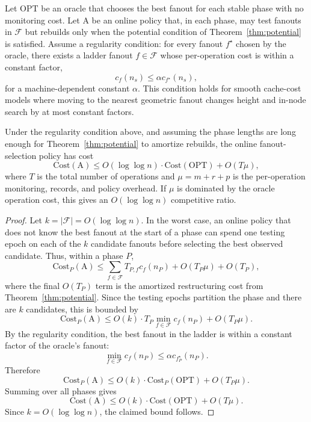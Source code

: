 Let $\mathrm{OPT}$ be an oracle that chooses the best fanout for each stable
phase with no monitoring cost.  Let $\mathrm{A}$ be an online policy that, in
each phase, may test fanouts in $\mathcal{F}$ but rebuilds only when the
potential condition of Theorem~\ref{thm:potential} is satisfied.  Assume a
regularity condition: for every fanout $f^\star$ chosen by the oracle, there
exists a ladder fanout $f\in\mathcal{F}$ whose per-operation cost is within a
constant factor,
\[
  c_f(n_s) \le \alpha c_{f^\star}(n_s),
\]
for a machine-dependent constant $\alpha$.  This condition holds for smooth
cache-cost models where moving to the nearest geometric fanout changes height
and in-node search by at most constant factors.

\begin{theorem}
\label{thm:competitive}
Under the regularity condition above, and assuming the phase lengths are long
enough for Theorem~\ref{thm:potential} to amortize rebuilds, the online
fanout-selection policy has cost
\[
  \mathrm{Cost}(\mathrm{A})
  \le O(\log\log n)\cdot \mathrm{Cost}(\mathrm{OPT})
  + O(T\mu),
\]
where $T$ is the total number of operations and
$\mu=m+r+p$ is the per-operation monitoring, records, and policy overhead.
If $\mu$ is dominated by the oracle operation cost, this gives an
$O(\log\log n)$ competitive ratio.
\end{theorem}

\begin{proof}
Let $k=|\mathcal{F}|=O(\log\log n)$.  In the worst case, an online policy that
does not know the best fanout at the start of a phase can spend one testing
epoch on each of the $k$ candidate fanouts before selecting the best observed
candidate.  Thus, within a phase $P$,
\[
  \mathrm{Cost}_P(\mathrm{A})
  \le \sum_{f\in\mathcal{F}} T_{P,f} c_f(n_P)
      + O(T_P\mu) + O(T_P),
\]
where the final $O(T_P)$ term is the amortized restructuring cost from
Theorem~\ref{thm:potential}.  Since the testing epochs partition the phase and
there are $k$ candidates, this is bounded by
\[
  \mathrm{Cost}_P(\mathrm{A})
  \le O(k)\cdot T_P \min_{f\in\mathcal{F}} c_f(n_P)
      + O(T_P\mu).
\]
By the regularity condition, the best fanout in the ladder is within a
constant factor of the oracle's fanout:
\[
  \min_{f\in\mathcal{F}} c_f(n_P)
  \le \alpha c_{f^\star_P}(n_P).
\]
Therefore
\[
  \mathrm{Cost}_P(\mathrm{A})
  \le O(k)\cdot \mathrm{Cost}_P(\mathrm{OPT}) + O(T_P\mu).
\]
Summing over all phases gives
\[
  \mathrm{Cost}(\mathrm{A})
  \le O(k)\cdot \mathrm{Cost}(\mathrm{OPT}) + O(T\mu).
\]
Since $k=O(\log\log n)$, the claimed bound follows.
\end{proof}

